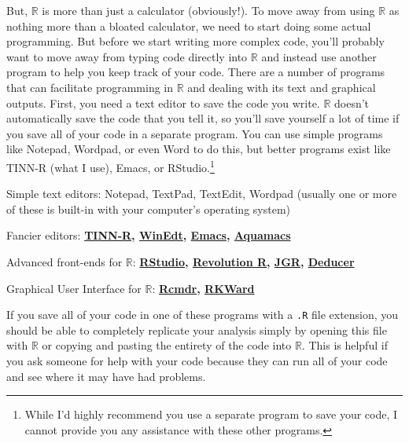 \documentclass[12pt]{article}
\begin{document}
But, $\mathbb{R}$ is more than just a calculator (obviously!). To move away from using $\mathbb{R}$ as nothing more than a bloated calculator, we need to start doing some actual programming. But before we start writing more complex code, you'll probably want to move away from typing code directly into $\mathbb{R}$ and instead use another program to help you keep track of your code. There are a number of programs that can facilitate programming in $\mathbb{R}$ and dealing with its text and graphical outputs. First, you need a text editor to save the code you write. $\mathbb{R}$ doesn't automatically save the code that you tell it, so you'll save yourself a lot of time if you save all of your code in a separate program. You can use simple programs like Notepad, Wordpad, or even Word to do this, but better programs exist like TINN-R (what I use), Emacs, or RStudio.\footnote{While I'd highly recommend you use a separate program to save your code, I cannot provide you any assistance with these other programs.}
\begin{itemize*}
\item Simple text editors: Notepad, TextPad, TextEdit, Wordpad (usually one or more of these is built-in with your computer's operating system)
\item Fancier editors: \textbf{\href{http://sciviews.org/Tinn-R/}{TINN-R}, \href{http://www.winedt.com/}{WinEdt}, \href{http://www.gnu.org/software/emacs/}{Emacs}, \href{http://aquamacs.org/}{Aquamacs}}
\item Advanced front-ends for $\mathbb{R}$: \textbf{\href{http://rstudio.org/}{RStudio}, \href{http://www.revolutionanalytics.com/products/revolution-enterprise.php}{Revolution R}, \href{http://rforge.net/JGR/}{JGR}, \href{http://www.deducer.org/pmwiki/pmwiki.php}{Deducer}}
\item Graphical User Interface for $\mathbb{R}$: \textbf{\href{http://socserv.mcmaster.ca/jfox/Misc/Rcmdr/}{Rcmdr}, \href{http://rkward.sourceforge.net/}{RKWard}}
\end{itemize*}

If you save all of your code in one of these programs with a \verb|.R| file extension, you should be able to completely replicate your analysis simply by opening this file with $\mathbb{R}$ or copying and pasting the entirety of the code into $\mathbb{R}$. This is helpful if you ask someone for help with your code because they can run all of your code and see where it may have had problems.
\end{document}
